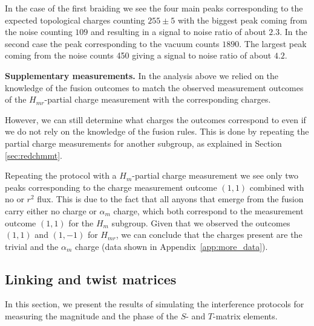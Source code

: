 \documentclass[a4paper,twocolumn,11pt, accepted=2024-06-14]{quantumarticle}
\begin{document}
In the case of the first braiding we see the four main peaks corresponding to the expected topological charges counting $255\pm 5$ with the biggest peak coming from the noise counting $109$ and resulting in a signal to noise ratio of about $2.3$. In the second case the peak corresponding to the vacuum counts $1890$. The largest peak coming from the noise counts 450 giving a signal to noise ratio of about $4.2$.




\textbf{Supplementary measurements.} In the analysis above we relied on the knowledge of the fusion outcomes to match the observed measurement outcomes of the $H_{mr}$-partial charge measurement with the corresponding charges. 

However, we can still determine what charges the outcomes correspond to even if we do not rely on the knowledge of the fusion rules. This is done by repeating the partial charge measurements for another subgroup, as explained in Section \ref{sec:redchmmt}.

Repeating the protocol with a $H_m$-partial charge measurement we see only two peaks corresponding to the charge measurement outcome $(1,1)$ combined with no or $r^2$ flux. This is due to the fact that all anyons that emerge from the fusion carry either no charge or $\alpha_m$ charge, which both correspond to the measurement outcome $(1,1)$ for the $H_m$ subgroup. Given that we observed the outcomes $(1,1)$ and $(1,-1)$ for $H_{mr}$, we can conclude that the charges present are the trivial and the $\alpha_m$ charge (data shown in Appendix~\ref{app:more_data}).




\subsection{Linking and twist matrices}\label{sec:num:intef}

In this section, we present the results of simulating the interference protocols for measuring the magnitude and the phase of the $S$- and $T$-matrix elements. 
\end{document}
